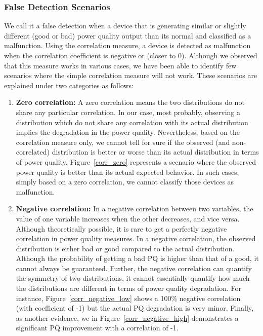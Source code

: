 \subsubsection{False Detection Scenarios}
We call it a false detection when a device that is generating similar or slightly different (good or bad) power quality output than its normal and classified as a malfunction. Using the correlation measure, a device is detected as malfunction when the correlation coefficient is negative or (closer to 0). Although we observed that this measure works in various cases, we have been able to identify few scenarios where the simple correlation measure will not work. These scenarios are explained under two categories as follows:

\begin{enumerate}
\item \textbf{Zero correlation:} A zero correlation means the two distributions do not share any particular correlation. In our case, most probably, observing a distribution which do not share any correlation with its actual distribution implies the degradation in the power quality. Nevertheless, based on the correlation measure only, we cannot tell for sure if the observed (and non-correlated) distribution is better or worse than its actual distribution in terms of power quality. Figure~\ref{corr_zero} represents a scenario where the observed power quality is better than its actual expected behavior. In such cases, simply based on a zero correlation, we cannot classify those devices as malfunction.

\item \textbf{Negative correlation:} In a negative correlation between two variables, the value of one variable increases when the other decreases, and vice versa. Although theoretically possible, it is rare to get a perfectly negative correlation in power quality measures. In a negative correlation, the observed distribution is either bad or good compared to the actual distribution. Although the probability of getting a bad PQ is higher than that of a good, it cannot always be guaranteed. Further, the negative correlation can quantify the symmetry of two distributions, it cannot essentially quantify how much the distributions are different in terms of power quality degradation. For instance, Figure~\ref{corr_negative_low} shows a 100\% negative correlation (with coefficient of -1) but the actual PQ degradation is very minor. Finally, as another evidence, we in Figure~\ref{corr_negative_high} demonstrates a significant PQ improvement with a correlation of -1.

\end{enumerate}

